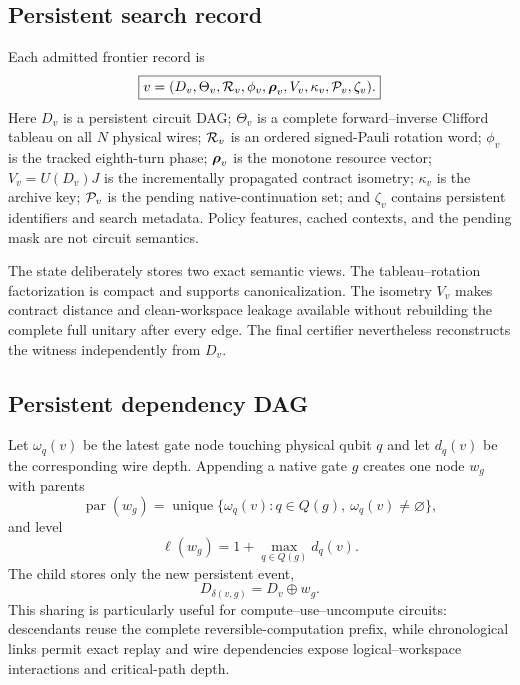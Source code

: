 \subsection{Persistent search record}

Each admitted frontier record is
\begin{equation}
\boxed{
v=(D_v,\Theta_v,\mathcal{R}_v,\phi_v,\boldsymbol{\rho}_v,
V_v,\kappa_v,\mathcal{P}_v,\zeta_v).
}
\label{eq:ancilla-record}
\end{equation}
Here $D_v$ is a persistent circuit DAG; $\Theta_v$ is a complete forward--inverse Clifford tableau on all $N$ physical wires; $\mathcal{R}_v$ is an ordered signed-Pauli rotation word; $\phi_v$ is the tracked eighth-turn phase; $\boldsymbol{\rho}_v$ is the monotone resource vector; $V_v=U(D_v)J$ is the incrementally propagated contract isometry; $\kappa_v$ is the archive key; $\mathcal{P}_v$ is the pending native-continuation set; and $\zeta_v$ contains persistent identifiers and search metadata. Policy features, cached contexts, and the pending mask are not circuit semantics.

The state deliberately stores two exact semantic views. The tableau--rotation factorization is compact and supports canonicalization. The isometry $V_v$ makes contract distance and clean-workspace leakage available without rebuilding the complete full unitary after every edge. The final certifier nevertheless reconstructs the witness independently from $D_v$.

\subsection{Persistent dependency DAG}

Let $\omega_q(v)$ be the latest gate node touching physical qubit $q$ and let $d_q(v)$ be the corresponding wire depth. Appending a native gate $g$ creates one node $w_g$ with parents
\begin{equation}
\operatorname{par}(w_g)=
\operatorname{unique}
\{\omega_q(v):q\in Q(g),\ \omega_q(v)\neq\varnothing\},
\label{eq:dag-parents}
\end{equation}
and level
\begin{equation}
\ell(w_g)=1+\max_{q\in Q(g)}d_q(v).
\label{eq:dag-level}
\end{equation}
The child stores only the new persistent event,
\begin{equation}
D_{\delta(v,g)}=D_v\oplus w_g.
\end{equation}
This sharing is particularly useful for compute--use--uncompute circuits: descendants reuse the complete reversible-computation prefix, while chronological links permit exact replay and wire dependencies expose logical--workspace interactions and critical-path depth.

